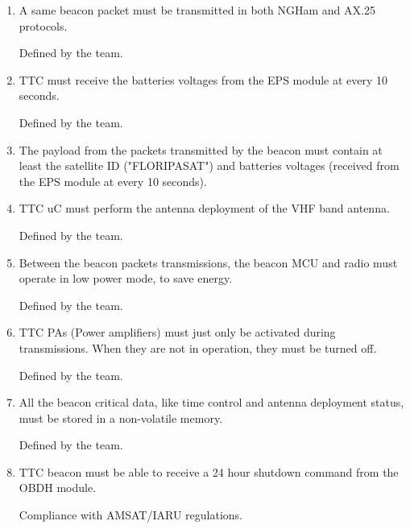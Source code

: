 \documentclass[12pt]{book}
\begin{document}
\begin{enumerate}[label=\textit{TMR \arabic*}, leftmargin=*, align=left]
	\item A same beacon packet must be transmitted in both NGHam and AX.25 protocols.
	
	\begin{footnotesize}
		Defined by the team.
	\end{footnotesize}
	
	\item TTC must receive the batteries voltages from the EPS module at every 10 seconds.
	
	\begin{footnotesize}
		Defined by the team.
	\end{footnotesize}
	
	\item The payload from the packets transmitted by the beacon must contain at least the satellite ID ("FLORIPASAT") and batteries voltages (received from the EPS module at every 10 seconds).
	\item TTC uC must perform the antenna deployment of the VHF band antenna.
	
	\begin{footnotesize}
		Defined by the team.
	\end{footnotesize}
	
	\item Between the beacon packets transmissions, the beacon MCU and radio must operate in low power mode, to save energy.
	
	\begin{footnotesize}
		Defined by the team.
	\end{footnotesize}
	
	\item TTC PAs (Power amplifiers) must just only be activated during transmissions. When they are not in operation, they must be turned off.
	
	\begin{footnotesize}
		Defined by the team.
	\end{footnotesize}
	
	\item All the beacon critical data, like time control and antenna deployment status, must be stored in a non-volatile memory.
	
	\begin{footnotesize}
		Defined by the team.
	\end{footnotesize}
	
	\item TTC beacon must be able to receive a 24 hour shutdown command from the OBDH module.
	
	\begin{footnotesize}
		Compliance with AMSAT/IARU regulations.
	\end{footnotesize}
	
\end{enumerate}
\end{document}
